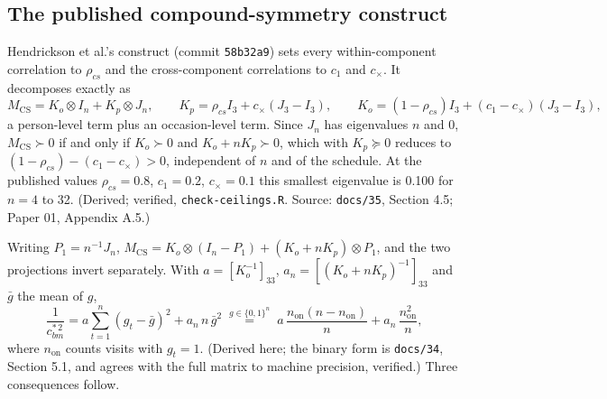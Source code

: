 \documentclass[11pt]{article}
\newcommand{\code}[1]{\texttt{#1}}
\begin{document}
\subsection{The published compound-symmetry construct}
\label{sec:ce-cs}

Hendrickson et al.'s construct (commit \code{58b32a9}) sets every
within-component correlation to $\rho_{cs}$ and the cross-component
correlations to $c_1$ and $c_\times$. It decomposes exactly as
\begin{equation}
M_{\mathrm{CS}} = K_o \otimes I_n + K_p \otimes J_n, \qquad
K_p = \rho_{cs} I_3 + c_\times (J_3 - I_3), \qquad
K_o = (1-\rho_{cs}) I_3 + (c_1 - c_\times)(J_3 - I_3),
\label{eq:ce-cs-decomp}
\end{equation}
a person-level term plus an occasion-level term. Since $J_n$ has
eigenvalues $n$ and 0, $M_{\mathrm{CS}} \succ 0$ if and only if
$K_o \succ 0$ and $K_o + nK_p \succ 0$, which with $K_p \succeq 0$
reduces to $(1 - \rho_{cs}) - (c_1 - c_\times) > 0$, independent of $n$ and
of the schedule. At the published values $\rho_{cs} = 0.8$, $c_1 = 0.2$,
$c_\times = 0.1$ this smallest eigenvalue is 0.100 for $n = 4$ to 32.
(Derived; verified, \code{check-ceilings.R}. Source: \code{docs/35},
Section 4.5; Paper 01, Appendix A.5.)

Writing $P_1 = n^{-1}J_n$, $M_{\mathrm{CS}} = K_o \otimes (I_n - P_1) +
(K_o + nK_p) \otimes P_1$, and the two projections invert separately.
With $a = [K_o^{-1}]_{33}$, $a_n = [(K_o + nK_p)^{-1}]_{33}$ and
$\bar g$ the mean of $g$,
\begin{equation}
\frac{1}{c_{bm}^{\ast\,2}} = a \sum_{t=1}^{n} (g_t - \bar g)^2 +
  a_n\, n\, \bar g^{2}
\;\overset{g \in \{0,1\}^n}{=}\;
a\,\frac{n_{\mathrm{on}}(n - n_{\mathrm{on}})}{n} +
  a_n\,\frac{n_{\mathrm{on}}^2}{n},
\label{eq:ce-cs-closed}
\end{equation}
where $n_{\mathrm{on}}$ counts visits with $g_t = 1$. (Derived here;
the binary form is \code{docs/34}, Section 5.1, and agrees with the
full matrix to machine precision, verified.) Three consequences follow.
\end{document}
